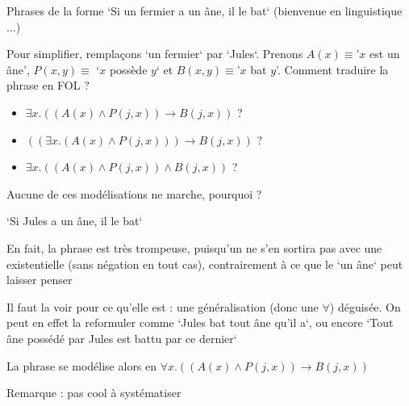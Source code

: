 \begin{frame}

Phrases de la forme `Si un fermier a un âne, il le bat` (bienvenue en linguistique ...)\pause\newline

Pour simplifier, remplaçons `un fermier` par `Jules`. Prenons $A(x) \equiv $'$x$ est un âne', $P(x,y) \equiv $ `$x$ possède $y$` et $B(x,y) \equiv $'$x$ bat $y$'. Comment traduire la phrase en FOL ?\pause\newline

\begin{itemize}
\item[] $\exists x. ((A(x) \wedge P(j,x)) \rightarrow B(j,x))$ ?\pause
\item[] $((\exists x. (A(x) \wedge P(j,x))) \rightarrow B(j,x))$ ?\pause
\item[] $\exists x. ((A(x) \wedge P(j,x)) \wedge B(j,x))$ ?\pause
\end{itemize}

Aucune de ces modélisations ne marche, pourquoi ?

\end{frame}
	

\begin{frame}

`Si Jules a un âne, il le bat`\newline

En fait, la phrase est très trompeuse, puisqu'un ne s'en sortira pas avec une existentielle (sans négation en tout cas), contrairement à ce que le `un âne` peut laisser penser\pause\newline

Il faut la voir pour ce qu'elle est : une généralisation (donc une $\forall$) déguisée. On peut en effet la reformuler comme `Jules bat tout âne qu'il a`, ou encore `Tout âne possédé par Jules est battu par ce dernier`\pause\newline

La phrase se modélise alors en $\forall x. ((A(x) \wedge P(j,x)) \rightarrow B(j,x))$\pause\newline

Remarque : pas cool à systématiser 

\end{frame}


